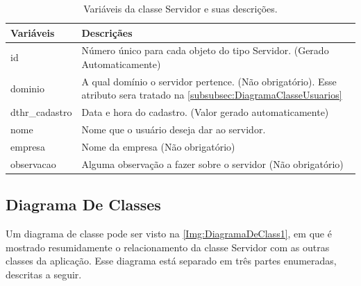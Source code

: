 \begin{table}[!ht]
\centering
\begin{tabular}{|l|l|}
\hline
{\color[HTML]{000000} \textbf{Variáveis}} & {\color[HTML]{000000} \textbf{Descriçães}}                                                                \\ \hline
id                                     & \multicolumn{1}{p{13.00cm}|}{Número único para cada objeto do tipo Servidor. (Gerado Automaticamente) }\\ \hline
dominio                                & \multicolumn{1}{p{13.00cm}|}{A qual domínio o servidor pertence. (Não obrigatório). Esse atributo sera tratado na \autoref{subsubsec:DiagramaClasseUsuarios}} \\ \hline
dthr\_cadastro                         & \multicolumn{1}{p{13.00cm}|}{Data e hora do cadastro. (Valor gerado automaticamente)} \\ \hline
nome                                   & \multicolumn{1}{p{13.00cm}|}{Nome que o usuário deseja dar ao servidor.}  \\ \hline
empresa                                & \multicolumn{1}{p{13.00cm}|}{Nome da empresa (Não obrigatório)} \\ \hline
observacao                             & \multicolumn{1}{p{13.00cm}|}{Alguma observação a fazer sobre o servidor (Não obrigatório)} \\ \hline
\end{tabular}
\caption[Variáveis da classe Servidor e suas descrições.]{Variáveis da classe Servidor e suas descrições.}
\label{Tab:VariaveisServidor}
\end{table}

\subsection{Diagrama De Classes}\label{subsec:DiagramaDeClasses}

Um diagrama de classe pode ser visto na \autoref{Img:DiagramaDeClass1}, em que é mostrado resumidamente o relacionamento da classe Servidor com as outras classes da aplicação. Esse diagrama está separado em três partes enumeradas, descritas a seguir.

